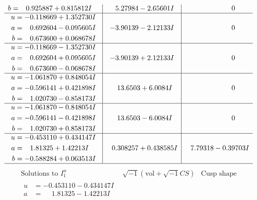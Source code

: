 \documentclass[1p]{elsarticle_modified}
\theoremstyle{definition}
\newcommand{\I}{\sqrt{-1}}
\begin{document}
$$\begin{array}{c|c|c}
\begin{aligned}
b &= \phantom{-}0.925887 + 0.815812 I\end{aligned}
 & \phantom{-}5.27984 - 2.65601 I & \phantom{-0.000000 } 0 \\ \hline\begin{aligned}
u &= -0.118669 + 1.352730 I \\
a &= \phantom{-}0.692604 - 0.095605 I \\
b &= \phantom{-}0.673600 + 0.068678 I\end{aligned}
 & -3.90139 - 2.12133 I & \phantom{-0.000000 } 0 \\ \hline\begin{aligned}
u &= -0.118669 - 1.352730 I \\
a &= \phantom{-}0.692604 + 0.095605 I \\
b &= \phantom{-}0.673600 - 0.068678 I\end{aligned}
 & -3.90139 + 2.12133 I & \phantom{-0.000000 } 0 \\ \hline\begin{aligned}
u &= -1.061870 + 0.848054 I \\
a &= -0.596141 + 0.421898 I \\
b &= \phantom{-}1.020730 - 0.858173 I\end{aligned}
 & \phantom{-}13.6503 + 6.0084 I & \phantom{-0.000000 } 0 \\ \hline\begin{aligned}
u &= -1.061870 - 0.848054 I \\
a &= -0.596141 - 0.421898 I \\
b &= \phantom{-}1.020730 + 0.858173 I\end{aligned}
 & \phantom{-}13.6503 - 6.0084 I & \phantom{-0.000000 } 0 \\ \hline\begin{aligned}
u &= -0.453110 + 0.434147 I \\
a &= \phantom{-}1.81325 + 1.42213 I \\
b &= -0.588284 + 0.063513 I\end{aligned}
 & \phantom{-}0.308257 + 0.438585 I & \phantom{-}7.79318 - 0.39703 I\\
 \hline 
 \end{array}$$\newpage$$\begin{array}{c|c|c}  
\text{Solutions to }I^u_{1}& \I (\text{vol} + \sqrt{-1}CS) & \text{Cusp shape}\\
 \hline 
\begin{aligned}
u &= -0.453110 - 0.434147 I \\
a &= \phantom{-}1.81325 - 1.42213 I \\

\end{aligned}
\end{array}$$
\end{document}
